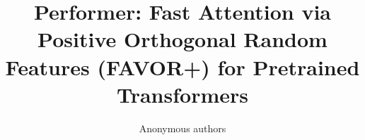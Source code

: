 \title{\textbf{Performer: Fast Attention via Positive Orthogonal Random Features (FAVOR+) for Pretrained Transformers}}

\author{Anonymous authors}
